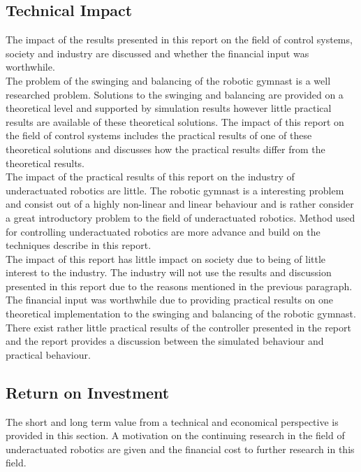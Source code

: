 \subsection{Technical Impact}
The impact of the results presented in this report on the field of control systems, society and industry are discussed and whether the financial input was worthwhile.\\

The problem of the swinging and balancing of the robotic gymnast is a well researched problem. Solutions to the swinging and balancing are provided on a theoretical level and supported by simulation results however little practical results are available of these theoretical solutions. The impact of this report on the field of control systems includes the practical results of one of these theoretical solutions and discusses how the practical results differ from the theoretical results.\\

The impact of the practical results of this report on the industry of underactuated robotics are little. The robotic gymnast is a interesting problem and consist out of a highly non-linear and linear behaviour and is rather consider a great introductory problem to the field of underactuated robotics. Method used for controlling underactuated robotics are more advance and build on the techniques describe in this report.\\

The impact of this report has little impact on society due to being of little interest to the industry. The industry will not use the results and discussion presented in this report due to the reasons mentioned in the previous paragraph.\\

The financial input was worthwhile due to providing practical results on one theoretical implementation to the swinging and balancing of the robotic gymnast. There exist rather little practical results of the controller presented in the report and the report provides a discussion between the simulated behaviour and practical behaviour.\\


\subsection{Return on Investment}
The short and long term value from a technical and economical perspective is provided in this section. A motivation on the continuing research in the field of underactuated robotics are given and the financial cost to further research in this field.\\


